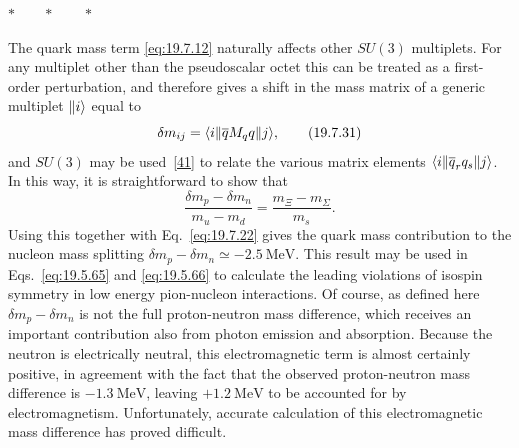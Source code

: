 \begin{center}
$* \qquad * \qquad *$
\end{center}

The quark mass term \eqref{eq:19.7.12} naturally affects other $SU(3)$ multiplets. For any multiplet other than the pseudoscalar octet this can be treated as a first-order perturbation, and therefore gives a shift in the mass matrix of a generic multiplet $\lVert i\rangle$ equal to
\begin{equation}
\delta m_{ij}
=\langle i\rVert\overline qM_qq\lVert j\rangle,
\tag{19.7.31}\label{eq:19.7.31}
\end{equation}
and $SU(3)$ may be used~\hyperref[ch19-ref-41]{[41]} to relate the various matrix elements $\langle i\rVert\overline q_rq_s\lVert j\rangle$. In this way, it is straightforward to show that
\begin{equation}
\frac{\delta m_p-\delta m_n}{m_u-m_d}
=\frac{m_\Xi-m_\Sigma}{m_s}.
\tag{19.7.32}\label{eq:19.7.32}
\end{equation}
Using this together with Eq.~\eqref{eq:19.7.22} gives the quark mass contribution to the nucleon mass splitting $\delta m_p-\delta m_n\simeq-2.5\ \mathrm{MeV}$. This result may be used in Eqs.~\eqref{eq:19.5.65} and \eqref{eq:19.5.66} to calculate the leading violations of isospin symmetry in low energy pion-nucleon interactions. Of course, as defined here $\delta m_p-\delta m_n$ is not the full proton-neutron mass difference, which receives an important contribution also from photon emission and absorption. Because the neutron is electrically neutral, this electromagnetic term is almost certainly positive, in agreement with the fact that the observed proton-neutron mass difference is $-1.3\ \mathrm{MeV}$, leaving $+1.2\ \mathrm{MeV}$ to be accounted for by electromagnetism. Unfortunately, accurate calculation of this electromagnetic mass difference has proved difficult.
